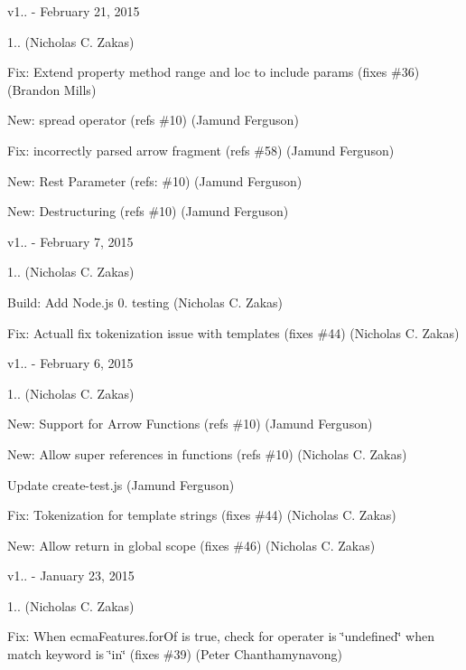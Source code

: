 v1.. -\/ February 21, 2015


\begin{DoxyItemize}
\item 1.. (Nicholas C. Zakas)
\item Fix\+: Extend property method range and loc to include params (fixes \#36) (Brandon Mills)
\item New\+: spread operator (refs \#10) (Jamund Ferguson)
\item Fix\+: incorrectly parsed arrow fragment (refs \#58) (Jamund Ferguson)
\item New\+: Rest Parameter (refs\+: \#10) (Jamund Ferguson)
\item New\+: Destructuring (refs \#10) (Jamund Ferguson)
\end{DoxyItemize}

v1.. -\/ February 7, 2015


\begin{DoxyItemize}
\item 1.. (Nicholas C. Zakas)
\item Build\+: Add Node.\+js 0. testing (Nicholas C. Zakas)
\item Fix\+: Actuall fix tokenization issue with templates (fixes \#44) (Nicholas C. Zakas)
\end{DoxyItemize}

v1.. -\/ February 6, 2015


\begin{DoxyItemize}
\item 1.. (Nicholas C. Zakas)
\item New\+: Support for Arrow Functions (refs \#10) (Jamund Ferguson)
\item New\+: Allow super references in functions (refs \#10) (Nicholas C. Zakas)
\item Update create-\/test.\+js (Jamund Ferguson)
\item Fix\+: Tokenization for template strings (fixes \#44) (Nicholas C. Zakas)
\item New\+: Allow return in global scope (fixes \#46) (Nicholas C. Zakas)
\end{DoxyItemize}

v1.. -\/ January 23, 2015


\begin{DoxyItemize}
\item 1.. (Nicholas C. Zakas)
\item Fix\+: When ecma\+Features.\+for\+Of is true, check for operater is \char`\"{}undefined\char`\"{} when match keyword is \char`\"{}in\char`\"{} (fixes \#39) (Peter Chanthamynavong)
\end{DoxyItemize}

